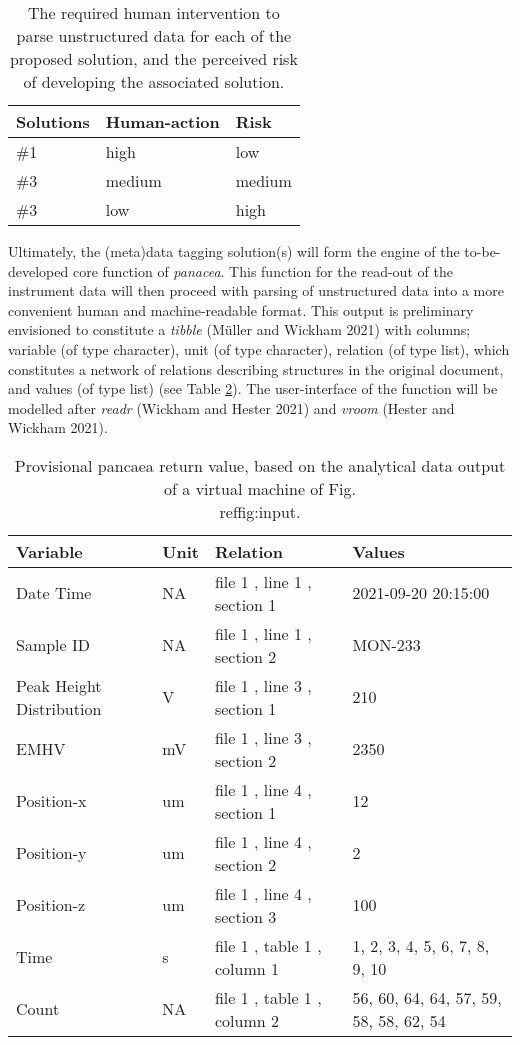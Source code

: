 \documentclass[]{article}
\begin{document}
\begin{table}

\caption{\label{tab:solutions}The required human intervention to parse unstructured data for 
  each of the proposed solution, and the perceived risk of developing 
  the associated solution.}
\centering
\begin{tabular}[t]{l|l|l}
\hline
Solutions & Human-action & Risk\\
\hline
\#1 & high & low\\
\hline
\#3 & medium & medium\\
\hline
\#3 & low & high\\
\hline
\end{tabular}
\end{table}

Ultimately, the (meta)data tagging solution(s) will form the engine of the to-be-developed core function of \emph{panacea}. This function for the read-out of the instrument data will then proceed with parsing of unstructured data into a more convenient human and machine-readable format. This output is preliminary envisioned to constitute a \emph{tibble} (Müller and Wickham 2021) with columns; variable (of type character), unit (of type character), relation (of type list), which constitutes a network of relations describing structures in the original document, and values (of type list) (see Table \ref{tab:output}). The user-interface of the function will be modelled after \emph{readr} (Wickham and Hester 2021) and \emph{vroom} (Hester and Wickham 2021).

\begin{table}

\caption{\label{tab:output}Provisional pancaea return value, based on the analytical data 
  output of a virtual machine of Fig. \\ref{fig:input}.}
\centering
\begin{tabular}[t]{l|l|l|l}
\hline
Variable & Unit & Relation & Values\\
\hline
Date Time & NA & file 1   , line 1   , section 1 & 2021-09-20 20:15:00\\
\hline
Sample ID & NA & file 1   , line 1   , section 2 & MON-233\\
\hline
Peak Height Distribution & V & file 1   , line 3   , section 1 & 210\\
\hline
EMHV & mV & file 1   , line 3   , section 2 & 2350\\
\hline
Position-x & um & file 1   , line 4   , section 1 & 12\\
\hline
Position-y & um & file 1   , line 4   , section 2 & 2\\
\hline
Position-z & um & file 1   , line 4   , section 3 & 100\\
\hline
Time & s & file 1  , table 1 , column 1 & 1, 2, 3, 4, 5, 6, 7, 8, 9, 10\\
\hline
Count & NA & file 1  , table 1 , column 2 & 56, 60, 64, 64, 57, 59, 58, 58, 62, 54\\
\hline
\end{tabular}
\end{table}
\end{document}
